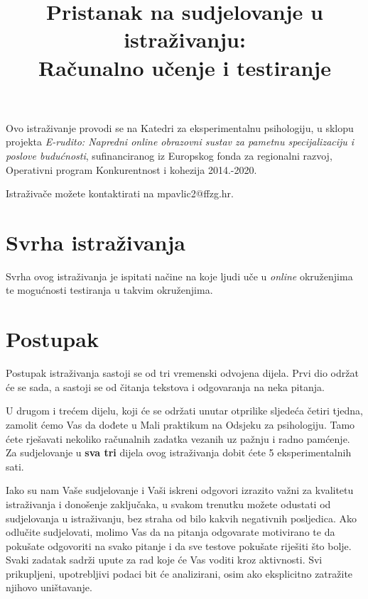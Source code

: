 \documentclass[11pt]{article}
\title{\bfseries \large Pristanak na sudjelovanje u istraživanju:\\
        \Large Računalno učenje i testiranje}
\date{}
\author{}
\begin{document}
\maketitle

\vspace*{-4em}

\noindent Ovo istraživanje provodi se na Katedri za eksperimentalnu psihologiju, u sklopu
projekta \textit{E-rudito: Napredni online obrazovni sustav za pametnu
    specijalizaciju i poslove budućnosti}, sufinanciranog iz Europskog fonda za
regionalni razvoj, Operativni program Konkurentnost i kohezija 2014.-2020.

\vspace{6pt}

\noindent Istraživače možete kontaktirati na mpavlic2@ffzg.hr.

\section{Svrha istraživanja}

Svrha ovog istraživanja je ispitati načine na koje ljudi uče u \textit{online}
okruženjima te mogućnosti testiranja u takvim okruženjima.

\section{Postupak}

Postupak istraživanja sastoji se od tri vremenski odvojena dijela. Prvi dio
održat će se sada, a sastoji se od čitanja tekstova i odgovaranja na neka
pitanja.

U drugom i trećem dijelu, koji će se održati unutar otprilike sljedeća četiri
tjedna, zamolit ćemo Vas da dođete u Mali praktikum na Odsjeku za psihologiju.
Tamo ćete rješavati nekoliko računalnih zadatka vezanih uz pažnju i radno
pamćenje. Za sudjelovanje u \textbf{sva tri} dijela ovog istraživanja dobit ćete
5 eksperimentalnih sati.  

Iako su nam Vaše sudjelovanje i Vaši iskreni odgovori izrazito važni za
kvalitetu istraživanja i donošenje zaključaka, u svakom trenutku možete odustati
od sudjelovanja u istraživanju, bez
straha od bilo kakvih negativnih posljedica. Ako odlučite sudjelovati,
molimo Vas da na pitanja odgovarate motivirano te da pokušate odgovoriti na svako
pitanje i da sve testove pokušate riješiti što bolje. Svaki zadatak sadrži upute
za rad koje će Vas voditi kroz aktivnosti.
Svi prikupljeni, upotrebljivi podaci bit će analizirani, osim ako eksplicitno
zatražite njihovo uništavanje.
\end{document}
